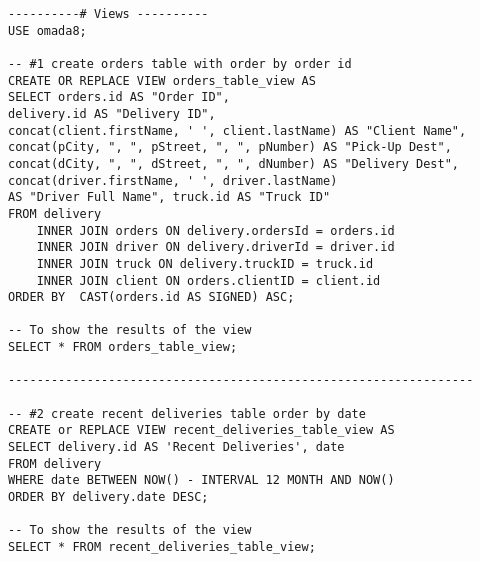 \begin{lstlisting}
----------# Views ----------
USE omada8;

-- #1 create orders table with order by order id
CREATE OR REPLACE VIEW orders_table_view AS
SELECT orders.id AS "Order ID", 
delivery.id AS "Delivery ID", 
concat(client.firstName, ' ', client.lastName) AS "Client Name",
concat(pCity, ", ", pStreet, ", ", pNumber) AS "Pick-Up Dest",
concat(dCity, ", ", dStreet, ", ", dNumber) AS "Delivery Dest",
concat(driver.firstName, ' ', driver.lastName)
AS "Driver Full Name", truck.id AS "Truck ID"
FROM delivery
	INNER JOIN orders ON delivery.ordersId = orders.id
	INNER JOIN driver ON delivery.driverId = driver.id
	INNER JOIN truck ON delivery.truckID = truck.id
	INNER JOIN client ON orders.clientID = client.id
ORDER BY  CAST(orders.id AS SIGNED) ASC;

-- To show the results of the view 
SELECT * FROM orders_table_view;

-----------------------------------------------------------------

-- #2 create recent deliveries table order by date 
CREATE or REPLACE VIEW recent_deliveries_table_view AS
SELECT delivery.id AS 'Recent Deliveries', date
FROM delivery
WHERE date BETWEEN NOW() - INTERVAL 12 MONTH AND NOW()
ORDER BY delivery.date DESC;

-- To show the results of the view
SELECT * FROM recent_deliveries_table_view;
\end{lstlisting}